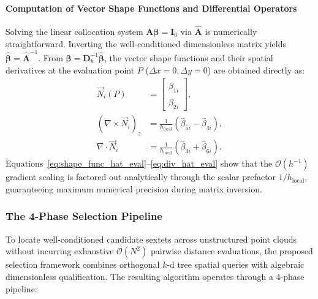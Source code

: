 \documentclass[preprint,12pt]{elsarticle}
\begin{document}
\paragraph{Computation of Vector Shape Functions and Differential Operators}
Solving the linear collocation system $\mathbf{A} \boldsymbol{\beta} = \mathbf{I}_6$ via $\widehat{\mathbf{A}}$ is numerically straightforward. Inverting the well-conditioned dimensionless matrix yields $\widehat{\boldsymbol{\beta}} = \widehat{\mathbf{A}}^{-1}$. From $\boldsymbol{\beta} = \mathbf{D}_h^{-1} \widehat{\boldsymbol{\beta}}$, the vector shape functions and their spatial derivatives at the evaluation point $P$ ($\Delta x = 0, \Delta y = 0$) are obtained directly as:
\begin{align}
    \vec{N}_i(P)                & = \begin{bmatrix} \hat{\beta}_{1i} \\ \hat{\beta}_{2i} \end{bmatrix}, \label{eq:shape_func_hat_eval}        \\
    (\nabla \times \vec{N}_i)_z & = \frac{1}{h_{\mathrm{local}}} \left( \hat{\beta}_{5i} - \hat{\beta}_{4i} \right), \label{eq:curl_hat_eval} \\
    \nabla \cdot \vec{N}_i      & = \frac{1}{h_{\mathrm{local}}} \left( \hat{\beta}_{3i} + \hat{\beta}_{6i} \right). \label{eq:div_hat_eval}
\end{align}
Equations~\eqref{eq:shape_func_hat_eval}--\eqref{eq:div_hat_eval} show that the $\mathcal{O}(h^{-1})$ gradient scaling is factored out analytically through the scalar prefactor $1/h_{\mathrm{local}}$, guaranteeing maximum numerical precision during matrix inversion.

\subsubsection{The 4-Phase Selection Pipeline}
\label{subsec:4phase_pipeline}

To locate well-conditioned candidate sextets across unstructured point clouds without incurring exhaustive $\mathcal{O}(N^2)$ pairwise distance evaluations, the proposed selection framework combines orthogonal $k$-d tree spatial queries \cite{bentley1975multidimensional,parreira2006efficient,fasshauer2007meshfree,goncalves2025tese,wu2026high} with algebraic dimensionless qualification. The resulting algorithm operates through a 4-phase pipeline:
\end{document}
